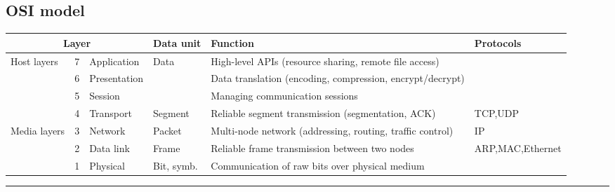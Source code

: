 \documentclass{form}
\begin{document}
\begin{minipage}{0.15\textwidth}
    \subsection*{OSI model}
\end{minipage}%
\begin{minipage}{0.89\textwidth}
    \begin{tabular}{@{}p{9mm} | l | l | l | l | l@{}}
        \multicolumn{3}{c|}{\textbf{Layer}}                    & Data unit                & Function                                                        & Protocols          \\ \hline
        \multirow{4}{9mm}{Host layers}      & 7 & Application  & \multirow{3}{*}{Data}    & High-level APIs (resource sharing, remote file access)          &                    \\ \cline{2-3} \cline{5-6}
                                            & 6 & Presentation &                          & Data translation (encoding, compression, encrypt/decrypt)       &                    \\ \cline{2-3} \cline{5-6}
                                            & 5 & Session      &                          & Managing communication sessions                                 &                    \\ \cline{2-6}
                                            & 4 & Transport    & Segment                  & Reliable segment transmission (segmentation, ACK)               & TCP,UDP            \\ \hline
        \multirow{3}{9mm}{Media layers}     & 3 & Network      & Packet                   & Multi-node network (addressing, routing, traffic control)       & IP                 \\ \cline{2-6}
                                            & 2 & Data link    & Frame                    & Reliable frame transmission between two nodes                   & ARP,MAC,Ethernet   \\ \cline{2-6}
                                            & 1 & Physical     & Bit, symb.               & Communication of raw bits over physical medium                  &                    \\
    \end{tabular}
\end{minipage}%

\vspace{0em}\rule{\textwidth}{1.0pt}\vspace{-0em}
\end{document}
